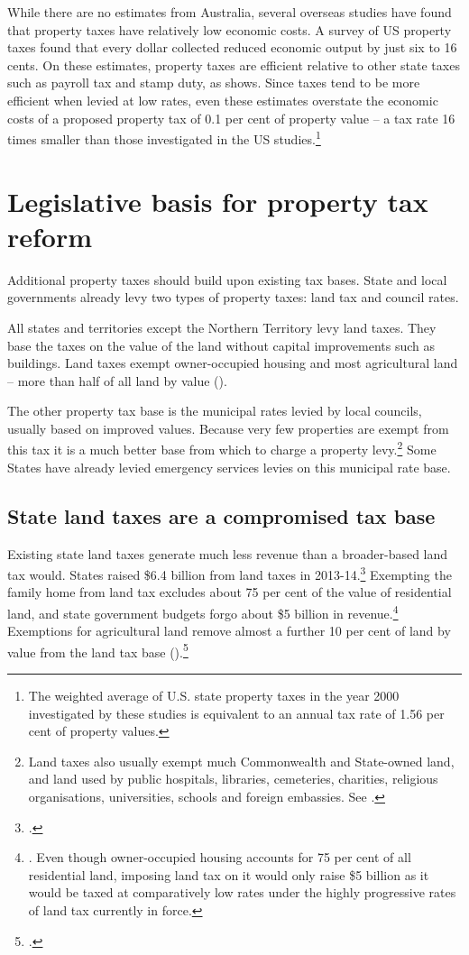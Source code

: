 While there are no estimates from Australia, several overseas studies have found that property taxes have relatively low economic costs. A survey of US property taxes found that every dollar collected reduced economic output by just six to 16 cents. On these estimates, property taxes are efficient relative to other state taxes such as payroll tax and stamp duty, as  shows. Since taxes tend to be more efficient when levied at low rates, even these estimates overstate the economic costs of a proposed property tax of 0.1 per cent of property value – a tax rate 16 times smaller than those investigated in the US studies.\footnote{The weighted average of U.S. state property taxes in the year 2000 investigated by these studies is equivalent to an annual tax rate of 1.56 per cent of property values.}  

\chapter{Legislative basis for property tax reform\label{chapter:PROP-5}}
Additional property taxes should build upon existing tax bases. State and local governments already levy two types of property taxes: land tax and council rates. 

All states and territories except the Northern Territory levy land taxes. They base the taxes on the value of the land without capital improvements such as buildings.  Land taxes exempt owner-occupied housing and most agricultural land – more than half of all land by value (). 

The other property tax base is the municipal rates levied by local councils, usually based on improved values. Because very few properties are exempt from this tax it is a much better base from which to charge a property levy.\footnote{Land taxes also usually exempt much Commonwealth and State-owned land, and land used by public hospitals, libraries, cemeteries, charities, religious organisations, universities, schools and foreign embassies. See \textcite[][105]{productivity2008assessing}.}  Some States have already levied emergency services levies on this municipal rate base.

\section{State land taxes are a compromised tax base}
Existing state land taxes generate much less revenue than a broader-based land tax would. States raised \$6.4 billion from land taxes in 2013-14.\footcite{ABS2015h}  Exempting the family home from land tax excludes about 75 per cent of the value of residential land, and state government budgets forgo about \$5 billion in revenue.\footnote{\textcites[][261]{HenryTaxReview2010}[][24]{KellyMaresHarrisonEtAl2013}. Even though owner-occupied housing accounts for 75 per cent of all residential land, imposing land tax on it would only raise \$5 billion as it would be taxed at comparatively low rates under the highly progressive rates of land tax currently in force.}  Exemptions for agricultural land remove almost a further 10 per cent of land by value from the land tax base ().\footcite[][260]{HenryTaxReview2010}

